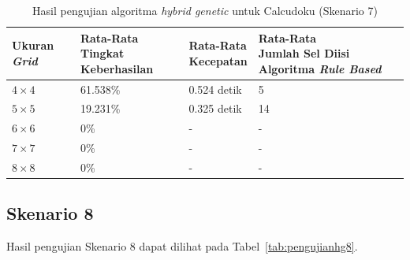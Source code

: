 \begin{table}
\centering
\captionsetup{justification=centering}
\caption[Hasil pengujian algoritma \textit{hybrid genetic} untuk Calcudoku (Skenario 7)]{Hasil pengujian algoritma \textit{hybrid genetic} untuk Calcudoku (Skenario 7)}
\begin{tabular}{| l | l | l | l |}
\hline
Ukuran \textit{Grid} & \makecell[l]{Rata-Rata \\ Tingkat Keberhasilan} & \makecell[l]{Rata-Rata \\ Kecepatan} & \makecell[l]{Rata-Rata \\ Jumlah Sel Diisi Algoritma \textit{Rule Based}} \\
\hline \hline
\begin{math}4 \times 4\end{math} & 61.538\% & 0.524 detik & 5 \\
\hline
\begin{math}5 \times 5\end{math} & 19.231\% & 0.325 detik & 14 \\
\hline
\begin{math}6 \times 6\end{math} & 0\% & - & - \\
\hline
\begin{math}7 \times 7\end{math} & 0\% & - & - \\
\hline
\begin{math}8 \times 8\end{math} & 0\% & - & - \\
\hline
\end{tabular}
\label{tab:pengujianhg7}
\end{table}

\clearpage

\subsection{Skenario 8}
\label{sec:skenario8}

Hasil pengujian Skenario 8 dapat dilihat pada Tabel~\ref{tab:pengujianhg8}.

